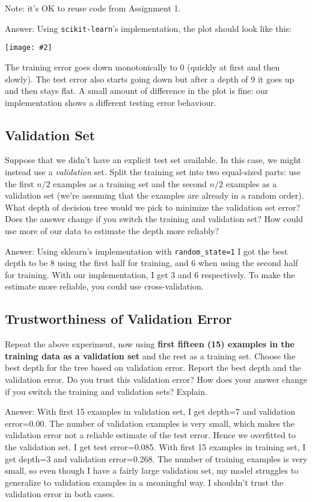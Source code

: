 \documentclass{article}
\def\ans#1{\par\gre{Answer: #1}}
\def\answer#1{\ans{#1}}
\def\blu#1{{\color{blu}#1}}
\def\gre#1{{\color{gre}#1}}
\newcommand{\centerfig}[2]{\begin{center}\texttt{[image: \#2]}\end{center}}
\begin{document}
	Note: it's OK to reuse code from Assignment 1.
	
	\answer{
		Using \texttt{scikit-learn}'s implementation, the plot should look like this:
		\centerfig{.45}{../figs/trainTest.pdf}
		The training error goes down monotonically to 0 (quickly at first and then slowly). The test error also starts going down but after a depth of 9 it goes up and then stays flat. A small amount of difference in the plot is fine: our implementation shows a different testing error behaviour.
	}
	
	\subsection{Validation Set}
	
	Suppose that we didn't have an explicit test set available. In this case, we might instead use a \emph{validation} set. Split the training set into two equal-sized parts: use the first $n/2$ examples as a training set and the second $n/2$ examples as a validation set (we're assuming that the examples are already in a random order). \blu{What depth of decision tree would we pick to minimize the validation set error? Does the answer change if you switch the training and validation set? How could use more of our data to  estimate the depth more reliably?}
	
	\answer{
		Using sklearn's implementation with \texttt{random\string_state=1} I got the best depth to be 8 using the first half for training,
		and 6 when using the second half for training. With our implementation, I get 3 and 6 respectively. To make the estimate more reliable, you could use cross-validation.
	}
	
	\subsection{Trustworthiness of Validation Error}
	
	Repeat the above experiment, now using \textbf{first fifteen (15) examples in the training data as a validation set} and the rest as a training set. Choose the best depth for the tree based on validation error. \blu{Report the best depth and the validation error. Do you trust this validation error? How does your answer change if you switch the training and validation sets? Explain.}
	
	\answer{
		With first 15 examples in validation set, I get depth=7 and validation error=0.00. The number of validation examples is very small, which makes the validation error not a reliable estimate of the test error. Hence we overfitted to the validation set. I get test error=0.085.
		With first 15 examples in training set, I get depth=3 and validation error=0.268. The number of training examples is very small, so even though I have a fairly large validation set, my model struggles to generalize to validation examples in a meaningful way. I shouldn't trust the validation error in both cases.
	}
	
\end{document}
